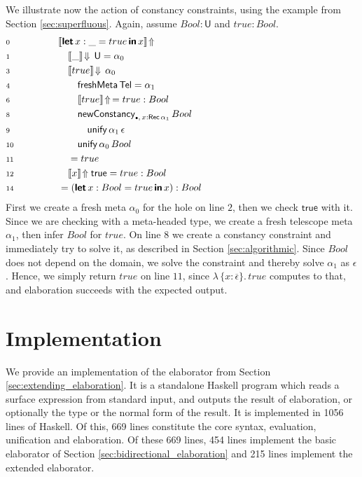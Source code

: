 \documentclass[acmsmall,review,anonymous,prologue,dvipsnames]{acmart}\settopmatter{printfolios=true,printccs=false,printacmref=false}
\newcommand{\slet}{\boldsymbol{\mathsf{let}}}
\renewcommand{\sin}{\boldsymbol{\mathsf{in}}}
\renewcommand{\U}{\mathsf{U}}
\newcommand{\emptycon}{\scaleobj{.75}\bullet}
\newcommand{\unify}{\mathsf{unify}}
\newcommand{\echeckt}[2]{\llbracket#1\rrbracket\!\Downarrow\,#2}
\newcommand{\einfert}[1]{\llbracket#1\rrbracket\!\Uparrow}
\newcommand{\true}{\mathsf{true}}
\newcommand{\Tel}{\mathsf{Tel}}
\newcommand{\Rec}{\mathsf{Rec}}
\newcommand{\ol}[1]{\overline{#1}}
\theoremstyle{remark}
\begin{document}
\begin{example}
We illustrate now the action of constancy constraints, using the example from
Section \ref{sec:superfluous}. Again, assume $Bool : \U$ and $true : Bool$.
\begin{alignat*}{3}
& \scriptstyle{0}\qquad\qquad && \einfert{\slet\,x : \_ = true\,\sin\,x}
      \hspace{21em}\\
& \scriptstyle{1} && \quad \echeckt{\_}{\U} = \alpha_0\\
& \scriptstyle{3} && \quad \echeckt{true}{\alpha_0}\\
& \scriptstyle{4} && \qquad \mathsf{freshMeta}\,\Tel = \alpha_1\\
& \scriptstyle{6} && \qquad \einfert{true}\,= true : Bool\\
& \scriptstyle{8} && \qquad \mathsf{newConstancy}_{\emptycon,\,x : \Rec\,\alpha_1}\,Bool\\
& \scriptstyle{9} && \qquad\quad \unify\,\alpha_1\,\epsilon\\
& \scriptstyle{10} && \qquad \unify\,\alpha_0\,Bool\\
& \scriptstyle{11} && \quad = true\\
& \scriptstyle{12} && \quad \einfert{x}{\true} = true : Bool\\
& \scriptstyle{14} && = (\slet\,x : Bool = true\,\sin\,x) : Bool
\end{alignat*}
First we create a fresh meta $\alpha_0$ for the hole on line $\scriptstyle{2}$,
then we check $\true$ with it. Since we are checking with a meta-headed type, we
create a fresh telescope meta $\alpha_1$, then infer $Bool$ for $true$. On line
$\scriptstyle{8}$ we create a constancy constraint and immediately try to solve
it, as described in Section \ref{sec:algorithmic}. Since $Bool$ does not depend
on the domain, we solve the constraint and thereby solve $\alpha_1$ as
$\epsilon$. Hence, we simply return $true$ on line $\scriptstyle{11}$, since
$\lambda\,\{x : \ol{\epsilon}\}.\,true$ computes to that, and elaboration
succeeds with the expected output.
\end{example}

\section{Implementation}
\label{sec:impl_and_eval}

We provide an implementation of the elaborator from Section
\ref{sec:extending_elaboration}. It is a standalone Haskell program which reads
a surface expression from standard input, and outputs the result of elaboration,
or optionally the type or the normal form of the result. It is implemented in
1056 lines of Haskell. Of this, 669 lines constitute the core syntax,
evaluation, unification and elaboration. Of these 669 lines, 454 lines implement
the basic elaborator of Section \ref{sec:bidirectional_elaboration} and 215
lines implement the extended elaborator.
\end{document}
